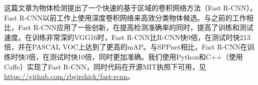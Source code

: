 \documentclass[../main]{subfile}
\begin{document}
这篇文章为物体检测提出了一个快速的基于区域的卷积网络方法（Fast R-CNN）。Fast R-CNN以前工作上使用深度卷积网络来高效分类物体候选。与之前的工作相比，Fast R-CNN应用了一些创新，在提高检测准确率的同时，提高了训练和测试速度。在训练非常深的VGG16时，Fast R-CNN比R-CNN快9倍，在测试时快213倍，并在PASCAL VOC上达到了更高的mAP。与SPPnet相比，Fast R-CNN在训练时快3倍，在测试时快10倍，同时更加准确。我们使用Python和C++（使用Caffe）实现了Fast R-CNN，同时代码在开源MIT执照下可用，见\href{https://github.com/rbgirshick/fast-rcnn}{https://github.com/rbgirshick/fast-rcnn}。
\end{document}
